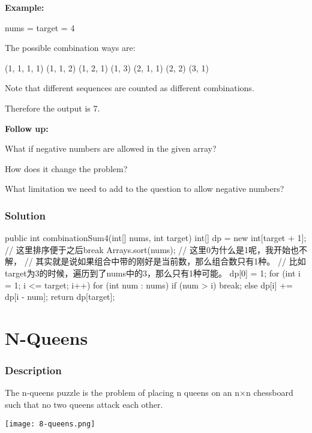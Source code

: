 \textbf{Example:}

nums = \code{[1, 2, 3]}
target = 4

The possible combination ways are:
\begin{Code}
(1, 1, 1, 1)
(1, 1, 2)
(1, 2, 1)
(1, 3)
(2, 1, 1)
(2, 2)
(3, 1)
\end{Code}

Note that different sequences are counted as different combinations.

Therefore the output is 7.

\textbf{Follow up:}

What if negative numbers are allowed in the given array?

How does it change the problem?

What limitation we need to add to the question to allow negative numbers?

\subsubsection{Solution}

\begin{Code}
public int combinationSum4(int[] nums, int target) {
    int[] dp = new int[target + 1];
    // 这里排序便于之后break
    Arrays.sort(nums);
    // 这里0为什么是1呢，我开始也不解，
    // 其实就是说如果组合中带的刚好是当前数，那么组合数只有1种。
    // 比如target为3的时候，遍历到了nums中的3，那么只有1种可能。
    dp[0] = 1;
    for (int i = 1; i <= target; i++) {
        for (int num : nums) {
            if (num > i) {
                break;
            } else {
                dp[i] += dp[i - num];
            }
        }
    }
    return dp[target];
}
\end{Code}

\newpage

\section{N-Queens} %

\subsubsection{Description}
The n-queens puzzle is the problem of placing n queens on an n×n chessboard such that no two queens attack each other.

\begin{center}
\texttt{[image: 8-queens.png]}\\
\end{center}

